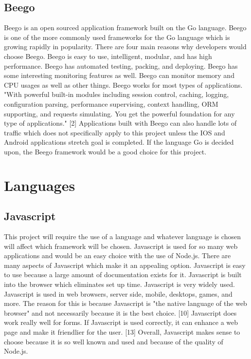 \documentclass[letterpaper,10pt,draftclsnofoot,onecolumn,]{article}
\begin{document}
\subsection{Beego}
Beego is an open sourced application framework built on the Go language. Beego is one of the more commonly used frameworks for the Go language which is growing rapidly in popularity. There are four main reasons why developers would choose Beego. Beego is easy to use, intelligent, modular, and has high performance. Beego has automated testing, packing, and deploying. Beego has some interesting monitoring features as well. Beego can monitor memory and CPU usages as well as other things. Beego works for most types of applications. "With powerful built-in modules including session control, caching, logging, configuration parsing, performance supervising, context handling, ORM supporting, and requests simulating. You get the powerful foundation for any type of applications." [2] Applications built with Beego can also handle lots of traffic which does not specifically apply to this project unless the IOS and Android applications stretch goal is completed. If the language Go is decided upon, the Beego framework would be a good choice for this project.

\section{Languages}

\subsection{Javascript}
This project will require the use of a language and whatever language is chosen will affect which framework will be chosen. Javascript is used for so many web applications and would be an easy choice with the use of Node.js. There are many aspects of Javascript which make it an appealing option. Javascript is easy to use because a large amount of documentation exists for it. Javascript is built into the browser which eliminates set up time. Javascript is very widely used. Javascript is used in web browsers, server side, mobile, desktops, games, and more. The reason for this is because Javascript is "the native language of the web browser" and not necessarily because it is the best choice. [10] Javascript does work really well for forms. If Javascript is used correctly, it can enhance a web page and make it friendlier for the user. [13] Overall, Javascript makes sense to choose because it is so well known and used and because of the quality of Node.js.
\end{document}
